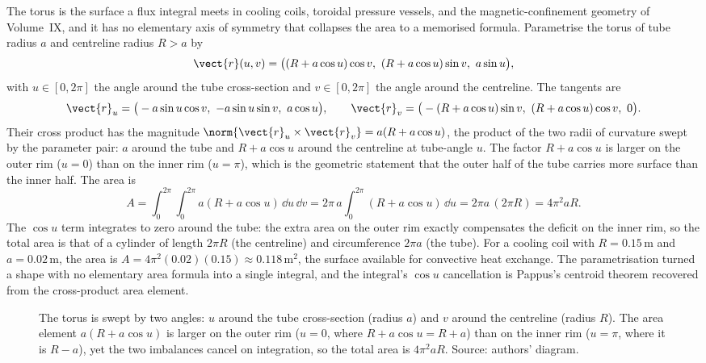 \begin{example}
The torus is the surface a flux integral meets in cooling coils,
toroidal pressure vessels, and the magnetic-confinement geometry of
Volume~IX, and it has no elementary axis of symmetry that collapses
the area to a memorised formula. Parametrise the torus of tube radius
$a$ and centreline radius $R > a$ by
\[
\vect{r}(u, v) = \big((R + a\cos u)\cos v,\ (R + a\cos u)\sin v,\
a\sin u\big),
\]
with $u \in [0, 2\pi]$ the angle around the tube cross-section and
$v \in [0, 2\pi]$ the angle around the centreline. The tangents are
\[
\vect{r}_{u} = \big(-a\sin u\cos v,\ -a\sin u\sin v,\ a\cos u\big),
\qquad
\vect{r}_{v} = \big(-(R + a\cos u)\sin v,\ (R + a\cos u)\cos v,\ 0\big).
\]
Their cross product has the magnitude
$\norm{\vect{r}_{u}\times\vect{r}_{v}} = a(R + a\cos u)$, the product
of the two radii of curvature swept by the parameter pair: $a$ around
the tube and $R + a\cos u$ around the centreline at tube-angle $u$.
The factor $R + a\cos u$ is larger on the outer rim ($u = 0$) than on
the inner rim ($u = \pi$), which is the geometric statement that the
outer half of the tube carries more surface than the inner half. The
area is
\[
A = \int_{0}^{2\pi}\!\int_{0}^{2\pi} a(R + a\cos u)\,\dd u\,\dd v =
2\pi\,a\int_{0}^{2\pi}(R + a\cos u)\,\dd u = 2\pi a\,(2\pi R) =
4\pi^{2}aR.
\]
The $\cos u$ term integrates to zero around the tube: the extra area
on the outer rim exactly compensates the deficit on the inner rim, so
the total area is that of a cylinder of length $2\pi R$ (the
centreline) and circumference $2\pi a$ (the tube). For a cooling coil
with $R = 0.15\,\si{\meter}$ and $a = 0.02\,\si{\meter}$, the area is
$A = 4\pi^{2}(0.02)(0.15) \approx 0.118\,\si{\meter\squared}$, the
surface available for convective heat exchange. The parametrisation
turned a shape with no elementary area formula into a single integral,
and the integral's $\cos u$ cancellation is Pappus's centroid theorem
recovered from the cross-product area element.
\end{example}

\begin{figure}[h]
  \centering
  
  \caption[Torus geometry: tube radius, centreline radius, and the
  varying area factor.]{The torus is swept by two angles: $u$ around
  the tube cross-section (radius $a$) and $v$ around the centreline
  (radius $R$). The area element $a(R + a\cos u)$ is larger on the
  outer rim ($u = 0$, where $R + a\cos u = R + a$) than on the inner
  rim ($u = \pi$, where it is $R - a$), yet the two imbalances cancel
  on integration, so the total area is $4\pi^{2}aR$. Source: authors'
  diagram.}
  \label{fig:vol02:ch08:torus-parametrisation}
\end{figure}

